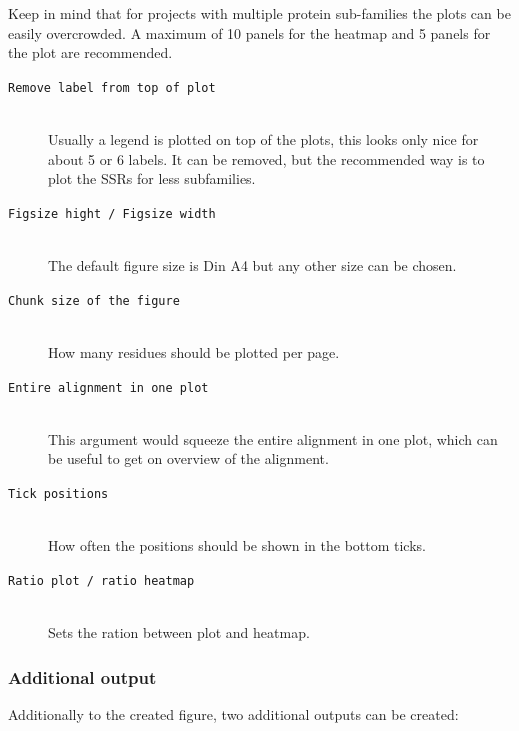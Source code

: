 \documentclass[a4paper,10pt]{article}
\begin{document}
Keep in mind that for projects with multiple protein sub-families the plots can be 
easily overcrowded. A maximum of 10 panels for the heatmap and 5 panels for the plot are 
recommended.

\begin{description}

\item[\texttt{Remove label from top of plot}] \hfill \\

Usually a legend is plotted on top 
 of the plots, this looks only nice for about 5 or 6 labels.
It can be removed, but the recommended way is to plot the SSRs for less subfamilies. 

\item[\texttt{Figsize hight / Figsize width}] \hfill \\

The default figure size is Din A4 but any other size can be chosen.

\item[\texttt{Chunk size of the figure}] \hfill \\
 
How many residues should be plotted per page. 

\item[\texttt{Entire alignment in one plot}] \hfill \\

This argument would squeeze the entire alignment in one plot, 
which can be useful to get on overview of the alignment.

\item[\texttt{Tick positions}] \hfill \\

How often the positions should be shown in the bottom ticks.

\item[\texttt{Ratio plot / ratio heatmap}] \hfill \\

Sets the ration between plot and heatmap.

\end{description}

\subsubsection{Additional output}

Additionally to the created figure, two additional outputs can be created:
\end{document}
